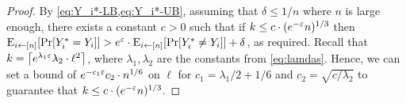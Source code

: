 \begin{proof}
	By \cref{eq:Y_i*-LB,eq:Y_i*-UB}, assuming that $\delta \leq 1/n$ where $n$ is large enough, 
	there exists a constant $c > 0$ such that if $k \leq c \cdot (e^{-\varepsilon} n)^{1/3}$ then $\eex{i \la [n]}{\pr{Y_i^* = Y_i}} > e^{\eps} \cdot \eex{i \la [n]}{\pr{Y_i^* \neq Y_i}} + \delta$, as required.
	Recall that $k = \ceil{e^{\lambda_1 \eps} \lambda_2 \cdot \ell^2}$, where $\lambda_1,\lambda_2$ are the constants from \cref{eq:lamdas}. Hence, we can set a bound of $e^{-c_1 \varepsilon} c_2 \cdot n^{1/6}$ on $\ell$ for $c_1 = \lambda_1/2 + 1/6$ and $c_2 = \sqrt{c/\lambda_2}$ to guarantee that $k \leq c \cdot (e^{-\varepsilon} n)^{1/3}$.
	
\end{proof}

